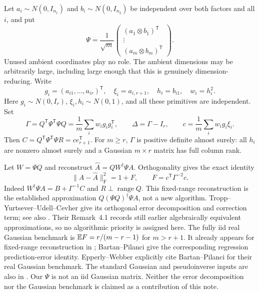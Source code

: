 \documentclass[11pt]{article}
\numberwithin{equation}{section}
\theoremstyle{definition}\newtheorem{definition}[theorem]{Definition}
\theoremstyle{remark}\newtheorem{remark}[theorem]{Remark}
\newcommand{\norm}[1]{\lVert#1\rVert}\newcommand{\ip}[2]{\langle#1,#2\rangle}
\newcommand{\Frob}[1]{\norm{#1}_{\mathrm F}}
\begin{document}
Let \(a_i\sim N(0,I_{n_1})\) and \(b_i\sim N(0,I_{n_2})\) be independent over both factors and all \(i\), and put
\[
 \Psi=\frac1{\sqrt m}\begin{pmatrix}(a_1\otimes b_1)^{\mathsf T}\\ \vdots\\(a_m\otimes b_m)^{\mathsf T}\end{pmatrix}.
\]
Unused ambient coordinates play no role. The ambient dimensions may be arbitrarily large, including large enough that this is genuinely dimension-reducing.
Write
\[
 g_i=(a_{i1},\ldots,a_{ir})^{\mathsf T},\quad
 \xi_i=a_{i,r+1},\quad h_i=b_{i1},\quad w_i=h_i^2.
\]
Here \(g_i\sim N(0,I_r)\), \(\xi_i,h_i\sim N(0,1)\), and all these primitives are independent. Set
\begin{equation}\label{p02:eq:model}
 \Gamma=Q^{\mathsf T}\Psi^{\mathsf T}\Psi Q
   =\frac1m\sum_i w_i g_i g_i^{\mathsf T},\qquad
 \Delta=\Gamma-I_r,\qquad
 c=\frac1m\sum_i w_i g_i\xi_i.
\end{equation}
Then \(C=Q^{\mathsf T}\Psi^{\mathsf T}\Psi R=c e_{r+1}^{\mathsf T}\).
For \(m\ge r\), \(\Gamma\) is positive definite almost surely: all \(h_i\) are nonzero almost surely and a Gaussian \(m\times r\) matrix has full column rank.

Let \(W=\Psi Q\) and reconstruct
\(\widehat A=QW^\dagger\Psi A\). Orthogonality gives the exact identity
\begin{equation}\label{p02:eq:error}
 \Frob{A-\widehat A}^2=1+F,\qquad
 F=c^{\mathsf T}\Gamma^{-2}c.
\end{equation}
Indeed \(W^\dagger\Psi A=B+\Gamma^{-1}C\) and \(R\perp\operatorname{range}Q\).
This fixed-range reconstruction is the established approximation
$Q(\Psi Q)^\dagger\Psi A$, not a new algorithm. Tropp--Yurtsever--Udell--Cevher
\cite[equations~(4.2)--(4.3), Lemmas~A.3--A.4]{TYUC2017} give its orthogonal
error decomposition and correction term; see also
\cite[Section~5.1, Lemma~5.1]{EW}. Their Remark~4.1 records still earlier
algebraically equivalent approximations, so no algorithmic priority is assigned here.
The fully iid real Gaussian benchmark is $\mathbb E F=r/(m-r-1)$ for $m>r+1$.
It already appears for fixed-range reconstruction in
\cite[Lemma~A.5]{TYUC2017}; Bartan--Pilanci
\cite[Lemma~1 in arXiv v2]{BP2020} give the corresponding regression
prediction-error identity. Epperly--Webber \cite[Theorem~2.1]{EW}
explicitly cite Bartan--Pilanci for their real Gaussian benchmark.
The standard Gaussian and pseudoinverse inputs are also in
\cite[Propositions~10.1--10.2]{HMT}.
Our $\Psi$ is not an iid Gaussian matrix. Neither the error decomposition nor
the Gaussian benchmark is claimed as a contribution of this note.
\end{document}
